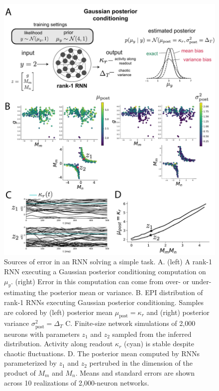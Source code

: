 \documentclass[11pt]{article}
\begin{document}
\begin{figure}
\begin{center}
\includegraphics[scale=0.7]{figures/fig5/fig5.pdf}
\end{center}
\caption{Sources of error in an RNN solving a simple task.  A. (left) A rank-1 RNN executing a Gaussian posterior conditioning computation on $\mu_y$. (right) Error in this computation can come from over- or under-estimating the posterior mean or variance. B. EPI distribution of rank-1 RNNs executing Gaussian posterior conditioning.  Samples are colored by (left) posterior mean $\mu_{\text{post}}=\kappa_r$ and (right) posterior variance $\sigma^2_{\text{post}}=\Delta_T$  C.  Finite-size network simulations of 2,000 neurons with parameters $z_1$ and $z_2$ sampled from the inferred distribution.  Activity along readout $\kappa_r$ (cyan) is stable despite chaotic fluctuations.  D. The posterior mean computed by RNNs parameterized by $z_1$ and $z_2$ pertrubed in the dimension of the product of $M_m$ and $M_n$.  Means and standard errors are shown across 10 realizations of 2,000-neuron networks.}
\label{fig:RNN}
\end{figure}
\end{document}
